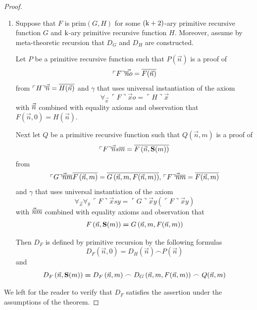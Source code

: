 \documentclass[10pt]{amsart}
\newcommand{\godel}[1]{\ulcorner #1 \urcorner}
\newcommand{\meq}{\boldsymbol{=}}
\begin{document}
\begin{proof}
\begin{enumerate}[label=\textbf{(\arabic*)}, leftmargin=3.0em]
		      Finally, let $D_F$ be a primitive recursive function defined by formula
		      $$D_F(\vec{n}) \meq P(\vec{n}) \frown Q(\vec{n})$$
		\item Suppose that $F$ is $\mathrm{prim}(G,H)$ for some $\rm{(k + 2)}$-ary primitive recursive function $G$ and $\rm{k}$-ary primitive recursive function $H$. Moreover, assume by meta-theoretic recursion that $D_G$ and $D_H$ are constructed.

		      Let $P$ be a primitive recursive function such that $P(\vec{n})$ is a proof of
		      $$\godel{F}\vec{\ol{n}o} = \ol{F(\vec{n})}$$
		      from $\godel{H}\vec{\ol{n}} = \ol{H(\vec{n})}$ and $\gamma$ that uses universal instantiation of the axiom
		      $$\forall_{\vec{x}}\,\godel{F}\vec{x}o = \godel{H}\vec{x}$$
		      with $\vec{\overline{n}}$ combined with equality axioms and observation that $F(\vec{n},0) \meq H(\vec{n})$.

		      Next let $Q$ be a primitive recursive function such that $Q(\vec{n},m)$ is a proof of
		      $$\godel{F}\vec{\ol{n}}s\ol{m} = \ol{F\left(\vec{n},\bd{S}(m)\right)}$$
		      from
		      $$\godel{G}\vec{\ol{n}}\ol{m}\ol{F\left(\vec{n},m\right)} = \ol{G\left(\vec{n},m,F(\vec{n},m)\right)},\,\godel{F}\vec{\ol{n}}\ol{m} = \ol{F(\vec{n},m)}$$
		      and $\gamma$ that uses universal instantiation of the axiom
		      $$\forall_{\vec{x}}\forall_y\,\godel{F}\vec{x}sy = \godel{G}\vec{x}y\left(\godel{F}\vec{x}y\right)$$
		      with $\vec{\overline{n}}\overline{m}$ combined with equality axioms and observation that
		      $$F\left(\vec{n},\bd{S}(m)\right) \meq G\left(\vec{n},m,F(\vec{n},m)\right)$$

		      Then $D_F$ is defined by primitive recursion by the following formulas
		      $$D_F(\vec{n},0) \meq D_H(\vec{n}) \frown P(\vec{n})$$
		      and
		      $$D_F\left(\vec{n},\bd{S}(m)\right) \meq D_F\left(\vec{n},m\right) \frown D_G\left(\vec{n},m,F(\vec{n},m)\right) \frown Q(\vec{n},m)$$
	\end{enumerate}
	We left for the reader to verify that $D_F$ satisfies the assertion under the assumptions of the theorem.
\end{proof}
\end{document}
